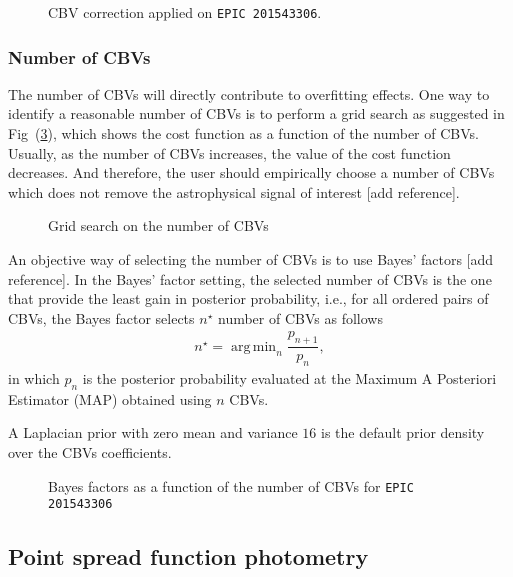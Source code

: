 \documentclass[twocolumn]{aastex62}
\DeclareMathOperator*{\argmin}{arg\,min}
\begin{document}
\begin{figure}
    \centering
    \caption{CBV correction applied on \texttt{EPIC 201543306}.
    \label{fig:cbv-correction-k2}}
\end{figure}

\subsubsection{Number of CBVs}
The number of CBVs will directly contribute to overfitting effects. One
way to identify a reasonable number of CBVs is to perform a grid search
as suggested in Fig~(\ref{fig:cbv-grid-search}), which shows the cost
function as a function of the number of CBVs. Usually, as the number of
CBVs increases, the value of the cost function decreases. And therefore,
the user should empirically choose a number of CBVs which does not
remove the astrophysical signal of interest [add reference].

\begin{figure}[!htb]
    \centering
    \caption{Grid search on the number of CBVs}
    \label{fig:cbv-grid-search}
\end{figure}

An objective way of selecting the number of CBVs is to use Bayes' factors
[add reference]. In the Bayes' factor setting, the selected number of
CBVs is the one that provide the least gain in posterior probability, i.e.,
for all ordered pairs of CBVs, the Bayes factor selects $n^{\star}$ number of CBVs
as follows
\begin{align}
    n^{\star} = \argmin_{n} \dfrac{p_{n+1}}{p_n},
\end{align}
in which $p_n$ is the posterior probability evaluated at the Maximum A Posteriori
Estimator (MAP) obtained using $n$ CBVs.

A Laplacian prior with zero mean and variance $16$ is the default prior
density over the CBVs coefficients.

\begin{figure}[!htb]
    \centering
    \caption{Bayes factors as a function of the number of CBVs for \texttt{EPIC 201543306}}
    \label{fig:cbv-grid-search}
\end{figure}


\subsection{Point spread function photometry}
\end{document}

